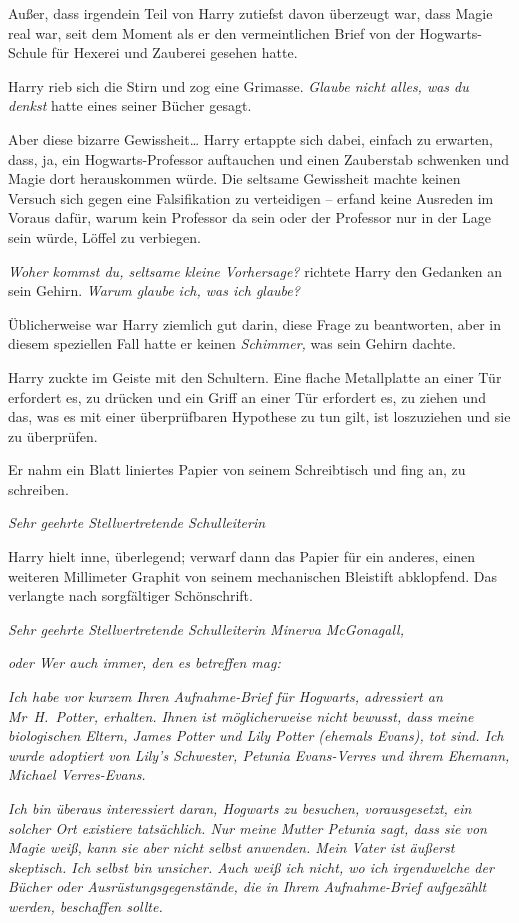 {Außer, dass irgendein Teil von Harry zutiefst davon überzeugt war, dass Magie real war, seit dem Moment als er den vermeintlichen Brief von der Hogwarts-Schule für Hexerei und Zauberei gesehen hatte.

Harry rieb sich die Stirn und zog eine Grimasse. \emph{Glaube nicht alles, was du denkst} hatte eines seiner Bücher gesagt.

Aber diese bizarre Gewissheit… Harry ertappte sich dabei, einfach zu erwarten, dass, ja, ein Hogwarts-Professor auftauchen und einen Zauberstab schwenken und Magie dort herauskommen würde. Die seltsame Gewissheit machte keinen Versuch sich gegen eine Falsifikation zu verteidigen -- erfand keine Ausreden im Voraus dafür, warum kein Professor da sein oder der Professor nur in der Lage sein würde, Löffel zu verbiegen.

\emph{Woher kommst du, seltsame kleine Vorhersage?} richtete Harry den Gedanken an sein Gehirn. \emph{Warum glaube ich, was ich glaube?}

Üblicherweise war Harry ziemlich gut darin, diese Frage zu beantworten, aber in diesem speziellen Fall hatte er keinen \emph{Schimmer,} was sein Gehirn dachte.

Harry zuckte im Geiste mit den Schultern. Eine flache Metallplatte an einer Tür erfordert es, zu drücken und ein Griff an einer Tür erfordert es, zu ziehen und das, was es mit einer überprüfbaren Hypothese zu tun gilt, ist loszuziehen und sie zu überprüfen.

Er nahm ein Blatt liniertes Papier von seinem Schreibtisch und fing an, zu schreiben.

\emph{Sehr geehrte Stellvertretende Schulleiterin}

Harry hielt inne, überlegend; verwarf dann das Papier für ein anderes, einen weiteren Millimeter Graphit von seinem mechanischen Bleistift abklopfend. Das verlangte nach sorgfältiger Schönschrift.

\emph{Sehr geehrte Stellvertretende Schulleiterin Minerva McGonagall,}

\emph{oder Wer auch immer, den es betreffen mag:}

\emph{Ich habe vor kurzem Ihren Aufnahme-Brief für Hogwarts, adressiert an} \emph{Mr~H.~Potter, erhalten. Ihnen ist möglicherweise nicht bewusst, dass meine biologischen Eltern, James Potter und Lily Potter (ehemals Evans), tot sind. Ich wurde adoptiert von Lily's Schwester, Petunia Evans-Verres und ihrem Ehemann, Michael Verres-Evans.}

\emph{Ich bin überaus interessiert daran, Hogwarts zu besuchen, vorausgesetzt, ein solcher Ort existiere tatsächlich. Nur meine Mutter Petunia sagt, dass sie von Magie weiß, kann sie aber nicht selbst anwenden. Mein Vater ist äußerst skeptisch. Ich selbst bin unsicher. Auch weiß ich nicht, wo ich irgendwelche der Bücher oder Ausrüstungsgegenstände, die in Ihrem Aufnahme-Brief aufgezählt werden, beschaffen sollte.}

}
